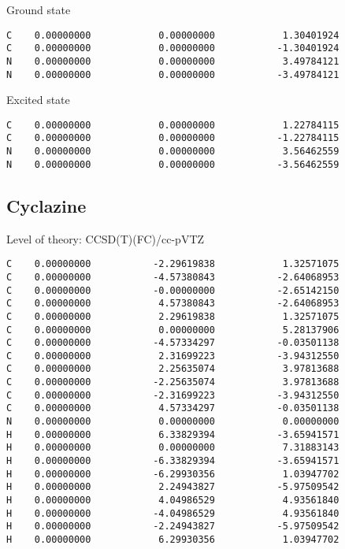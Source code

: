 \documentclass[journal=jctcce,manuscript=article,layout=traditional]{achemso}
\newcommand{\TZ}{cc-pVTZ}
\begin{document}
\begin{singlespace}
\noindent Ground state
\begin{verbatim}
C    0.00000000            0.00000000            1.30401924
C    0.00000000            0.00000000           -1.30401924
N    0.00000000            0.00000000            3.49784121
N    0.00000000            0.00000000           -3.49784121
\end{verbatim}
\end{singlespace}

\begin{singlespace}
\noindent Excited state
\begin{verbatim}
C    0.00000000            0.00000000            1.22784115
C    0.00000000            0.00000000           -1.22784115
N    0.00000000            0.00000000            3.56462559
N    0.00000000            0.00000000           -3.56462559
\end{verbatim}
\end{singlespace}

\subsection*{Cyclazine}

\begin{singlespace}
Level of theory: CCSD(T)(FC)/{\TZ}
\begin{verbatim}
C    0.00000000           -2.29619838            1.32571075
C    0.00000000           -4.57380843           -2.64068953
C    0.00000000           -0.00000000           -2.65142150
C    0.00000000            4.57380843           -2.64068953
C    0.00000000            2.29619838            1.32571075
C    0.00000000            0.00000000            5.28137906
C    0.00000000           -4.57334297           -0.03501138
C    0.00000000            2.31699223           -3.94312550
C    0.00000000            2.25635074            3.97813688
C    0.00000000           -2.25635074            3.97813688
C    0.00000000           -2.31699223           -3.94312550
C    0.00000000            4.57334297           -0.03501138
N    0.00000000            0.00000000            0.00000000
H    0.00000000            6.33829394           -3.65941571
H    0.00000000            0.00000000            7.31883143
H    0.00000000           -6.33829394           -3.65941571
H    0.00000000           -6.29930356            1.03947702
H    0.00000000            2.24943827           -5.97509542
H    0.00000000            4.04986529            4.93561840
H    0.00000000           -4.04986529            4.93561840
H    0.00000000           -2.24943827           -5.97509542
H    0.00000000            6.29930356            1.03947702
\end{verbatim}
\end{singlespace}
\end{document}
